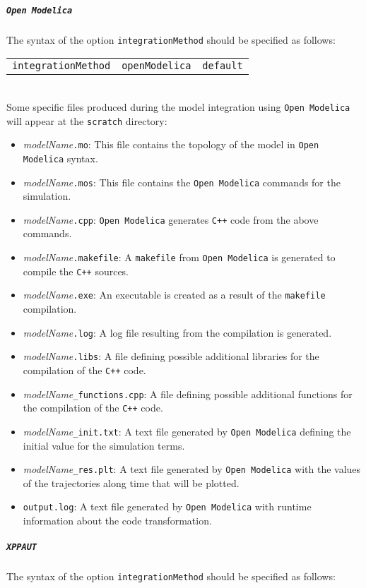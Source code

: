 \documentclass[a4paper, 11pt]{article}
\begin{document}
\subparagraph{\texttt{Open Modelica}}
The syntax of the option \texttt{integrationMethod} should be specified as follows:\\[1.5ex]
\begin{tabular}{ccc}\texttt{integrationMethod}&\texttt{openModelica}&\texttt{default}\end{tabular}\\[1.5ex]
Some specific files produced during the model integration using \texttt{Open Modelica} will appear at the \texttt{scratch} directory:
\begin{itemize}
  \item \textit{modelName}\texttt{.mo}:
    This file contains the topology of the model in \texttt{Open Modelica} syntax.
  \item \textit{modelName}\texttt{.mos}:
    This file contains the \texttt{Open Modelica} commands for the simulation.
  \item \textit{modelName}\texttt{.cpp}:
    \texttt{Open Modelica} generates \texttt{C++} code from the above commands.
  \item \textit{modelName}\texttt{.makefile}:
    A \texttt{makefile} from \texttt{Open Modelica} is generated to compile the \texttt{C++} sources.
  \item \textit{modelName}\texttt{.exe}:
    An executable is created as a result of the \texttt{makefile} compilation.
  \item \textit{modelName}\texttt{.log}:
    A log file resulting from the compilation is generated.
  \item \textit{modelName}\texttt{.libs}:
    A file defining possible additional libraries for the compilation of the \texttt{C++} code.
  \item \textit{modelName}\texttt{\_functions.cpp}:
    A file defining possible additional functions for the compilation of the \texttt{C++} code.
  \item \textit{modelName}\texttt{\_init.txt}:
    A text file generated by \texttt{Open Modelica} defining the initial value for the simulation terms.
  \item \textit{modelName}\texttt{\_res.plt}:
    A text file generated by \texttt{Open Modelica} with the values of the trajectories along time that will be plotted.    
  \item \texttt{output.log}:  
    A text file generated by \texttt{Open Modelica} with runtime information about the code transformation.
\end{itemize}
\subparagraph{\texttt{XPPAUT}}
The syntax of the option \texttt{integrationMethod} should be specified as follows:\\[1.5ex]
\end{document}

